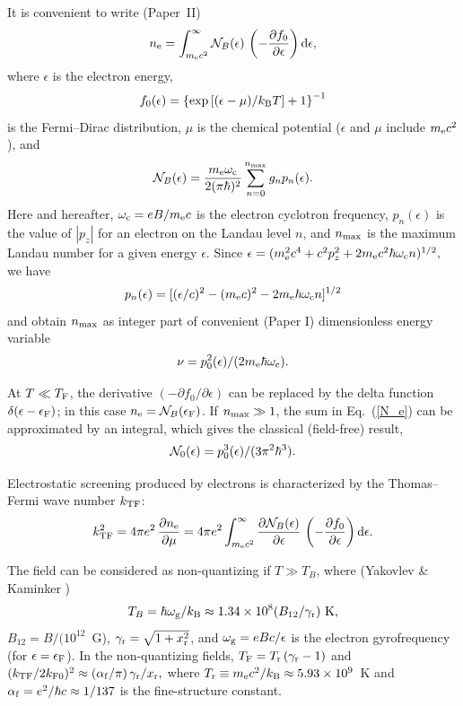 \documentclass{aa}
\newcommand{\beq}{\begin{equation}}
\newcommand{\eeq}{\end{equation}}
\newcommand{\req}[1]{Eq.~(\ref{#1})}
\newcommand{\kB}{k_{\rm B}}
\newcommand{\omc}{\omega_{\rm c}}
\newcommand{\omg}{\omega_{\rm g}}
\newcommand{\mel}{m_{\rm e}}
\newcommand{\xr}{x_{\rm r}}
\newcommand{\EF}{\epsilon_{\rm F}}
\newcommand{\Ne}{{\cal N}_B(\epsilon)}
\newcommand{\Necl}{{\cal N}_0(\epsilon)}
\newcommand{\dfde}{{\partial f_0 \over\partial\epsilon}}
\begin{document}
It is convenient to write (Paper~II)
\beq
    n_{\rm e} = \int_{\mel c^2}^{\infty} \Ne \,
             \left( -\dfde \right)
             {\rm d} \epsilon,
\label{n_e}
\eeq
where $\epsilon$ is the electron energy,
\beq
    f_0(\epsilon) = \left\{ \exp \left[
         (\epsilon - \mu) / \kB T \right]+1 \right\}^{-1}
\eeq
is the Fermi--Dirac distribution,
$\mu$ is the chemical potential ($\epsilon$ and $\mu$
include $\mel c^2$),
and
\beq
    \Ne = {\mel \omc \over 2 (\pi \hbar)^2}
            \sum_{n=0}^{n_{\rm max}} g_n p_n(\epsilon).
\label{N_e}
\eeq
Here and hereafter,
$\omc=eB/\mel c$ is the electron cyclotron frequency,
$p_n(\epsilon)$  is
the value of $|p_z|$ for an electron on the Landau level $n$,
and $n_{\rm max}$ is the maximum Landau number
for a given energy $\epsilon$.
Since
$
 \epsilon = (\mel^2 c^4 + c^2 p_z^2 + 2 \mel c^2 \hbar \omc n)^{1/2},
$
we have
\beq
   p_n(\epsilon) = [(\epsilon/c)^2 - (\mel c)^2
           - 2 \mel \hbar \omc n]^{1/2}
\eeq
and obtain $n_{\rm max}$ as integer part of convenient
(Paper I) dimensionless energy variable
\beq
  \nu = p_0^2(\epsilon) / (2 \mel \hbar \omc).
\label{nu}
\eeq

At $T\ll T_{\rm F}$,
the derivative $(-\partial f_0/\partial\epsilon)$
can be replaced by
the delta function $\delta(\epsilon-\EF)$;
in this case $n_{\rm e}={\cal N}_B(\EF)$.
If $n_{\rm max} \gg 1$, the sum in \req{N_e}
can be approximated by an integral,
which gives the classical (field-free) result,
\beq
   \Necl = p_0^3(\epsilon)/(3\pi^2\hbar^3).
\eeq

Electrostatic screening produced by electrons is
characterized by the Thomas--Fermi wave number $k_{\rm TF}$:
\beq
     k^2_{\rm TF}=4\pi e^2 \, {\partial n_{\rm e}\over\partial \mu}
   = 4\pi e^2
   \int_{\mel c^2}^{\infty} {\partial \Ne \over \partial \epsilon}\,
             \left( -\dfde \right)
             {\rm d} \epsilon.
\eeq

The field can be considered as non-quantizing
if $T\gg T_B$, where (Yakovlev \& Kaminker \cite{yk94})
\beq
    T_B = {\hbar\omg/\kB} \approx
             {1.34\times10^8 (B_{12}/\gamma_{\rm r})}{\rm~K},
\eeq
$B_{12}=B/(10^{12}$~G),
$\gamma_{\rm r}=\sqrt{1+\xr^2}$, and $\omg=eBc/\epsilon$
is the electron gyrofrequency
(for $\epsilon= \EF$).
In the non-quantizing fields,
$T_{\rm F} = T_{\rm r}\,(\gamma_{\rm r}-1)$
and
$
     (k_{\rm TF}/2 k_{\rm F0})^2 \approx
     (\alpha_{\rm f} /\pi)\,\gamma_{\rm r}/\xr,
$
where
$T_{\rm r}\equiv\mel c^2/\kB
\approx 5.93\times10^9$~K and
$\alpha_{\rm f} = e^2/\hbar c \approx 1/137$ is the fine-structure
constant.
\end{document}
